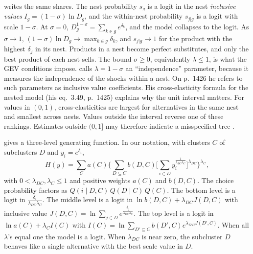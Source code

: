 \citet[eqs.~23--25, p.~253]{Berry1994} writes the same shares. The nest probability $s_g$ is a logit in the
nest \emph{inclusive values} $I_g = (1 - \sigma)\ln D_g$, and the within-nest probability $s_{j|g}$ is a logit
with scale $1 - \sigma$. At $\sigma = 0$, $D_g^{1 - \sigma} = \sum_{k \in g}e^{\delta_k}$, and the model collapses to the
logit. As $\sigma \to 1$, $(1 - \sigma)\ln D_g \to \max_{k \in g}\delta_k$, and $s_{j|g} \to 1$ for the product with the
highest $\delta_j$ in its nest. Products in a nest become perfect substitutes, and only the best product of each
nest sells. The bound $\sigma \geq 0$, equivalently $\lambda \leq 1$, is what the GEV conditions impose.
\citet[pp.~1423 and 1425]{McFadden1984} calls $\lambda = 1 - \sigma$ an ``independence'' parameter, because it
measures the independence of the shocks within a nest. On p.~1426 he refers to such parameters as inclusive
value coefficients. His cross-elasticity formula for the nested model (his eq.~3.49, p.~1425) explains why the
unit interval matters. For values in $(0, 1)$, cross-elasticities are largest for alternatives in the same nest
and smallest across nests. Values outside the interval reverse one of these rankings. Estimates outside $(0, 1]$
may therefore indicate a misspecified tree \citep[pp.~1425--1426]{McFadden1984}.

\begin{remark}\label{rem:B-three-level}
\citet[eqs.~3.33--3.39, pp.~1421--1422]{McFadden1984} gives a three-level generating function. In our notation,
with clusters $C$ of subclusters $D$ and $y_i = e^{\delta_i}$,
\begin{equation*}
H(y) = \sum_Ca(C)\Bigg\{\sum_{D \subseteq C}b(D, C)\Big[\sum_{i \in D}y_i^{\frac{1}{\lambda_{DC}\lambda_C}}\Big]^{\lambda_{DC}}\Bigg\}^{\lambda_C},
\end{equation*}
with $0 < \lambda_{DC}, \lambda_C \leq 1$ and positive weights $a(C)$ and $b(D, C)$. The choice probability factors as
$Q(i \mid D, C)\,Q(D \mid C)\,Q(C)$. The bottom level is a logit in $\frac{\delta_i}{\lambda_{DC}\lambda_C}$. The middle level is a
logit in $\ln b(D, C) + \lambda_{DC}J(D, C)$ with inclusive value
$J(D, C) = \ln\sum_{j \in D}e^{\frac{\delta_j}{\lambda_{DC}\lambda_C}}$. The top level is a logit in $\ln a(C) + \lambda_CI(C)$ with
$I(C) = \ln\sum_{D' \subseteq C}b(D', C)e^{\lambda_{D'C}J(D', C)}$. When all $\lambda$'s equal one the model is a logit. When
$\lambda_{DC}$ is near zero, the subcluster $D$ behaves like a single alternative with the best scale value in $D$.
\end{remark}

